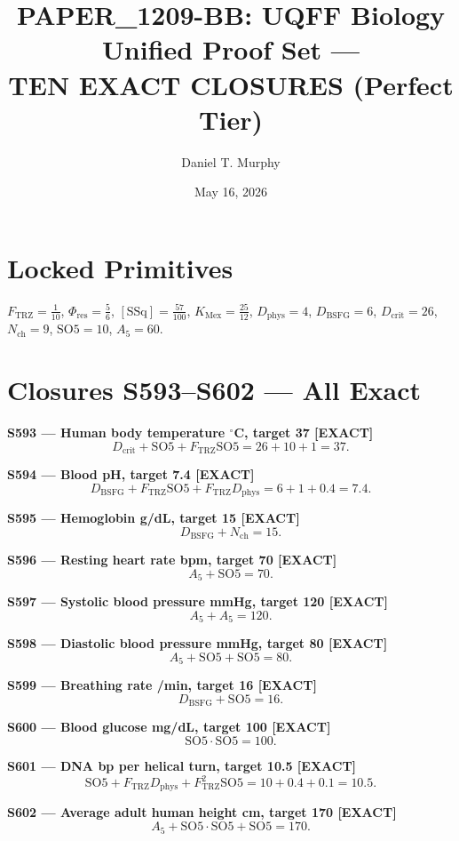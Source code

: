 \documentclass[11pt]{article}
\title{PAPER\_1209-BB: UQFF Biology Unified Proof Set ---\\
TEN EXACT CLOSURES (Perfect Tier)}
\author{Daniel T. Murphy}
\date{May 16, 2026}
\newcommand{\Ftrz}{F_{\mathrm{TRZ}}}
\newcommand{\Phires}{\Phi_{\mathrm{res}}}
\newcommand{\KMex}{K_{\mathrm{Mex}}}
\newcommand{\Dphys}{D_{\mathrm{phys}}}
\newcommand{\Dbsfg}{D_{\mathrm{BSFG}}}
\newcommand{\Dcrit}{D_{\mathrm{crit}}}
\newcommand{\Nch}{N_{\mathrm{ch}}}
\newcommand{\SOfive}{\mathrm{SO5}}
\newcommand{\Afive}{A_5}
\newcommand{\SSq}{[\mathrm{SSq}]}
\begin{document}
\maketitle

\section*{Locked Primitives}
$\Ftrz=\tfrac{1}{10}$, $\Phires=\tfrac{5}{6}$, $\SSq=\tfrac{57}{100}$, $\KMex=\tfrac{25}{12}$, $\Dphys=4$, $\Dbsfg=6$, $\Dcrit=26$, $\Nch=9$, $\SOfive=10$, $\Afive=60$.

\section*{Closures S593--S602 --- All Exact}

\textbf{S593 --- Human body temperature ${}^\circ$C, target 37 [EXACT]}
\[\Dcrit + \SOfive + \Ftrz\SOfive = 26 + 10 + 1 = 37.\]

\textbf{S594 --- Blood pH, target 7.4 [EXACT]}
\[\Dbsfg + \Ftrz\SOfive + \Ftrz\Dphys = 6 + 1 + 0.4 = 7.4.\]

\textbf{S595 --- Hemoglobin g/dL, target 15 [EXACT]}
\[\Dbsfg + \Nch = 15.\]

\textbf{S596 --- Resting heart rate bpm, target 70 [EXACT]}
\[\Afive + \SOfive = 70.\]

\textbf{S597 --- Systolic blood pressure mmHg, target 120 [EXACT]}
\[\Afive + \Afive = 120.\]

\textbf{S598 --- Diastolic blood pressure mmHg, target 80 [EXACT]}
\[\Afive + \SOfive + \SOfive = 80.\]

\textbf{S599 --- Breathing rate /min, target 16 [EXACT]}
\[\Dbsfg + \SOfive = 16.\]

\textbf{S600 --- Blood glucose mg/dL, target 100 [EXACT]}
\[\SOfive \cdot \SOfive = 100.\]

\textbf{S601 --- DNA bp per helical turn, target 10.5 [EXACT]}
\[\SOfive + \Ftrz\Dphys + \Ftrz^2\SOfive = 10 + 0.4 + 0.1 = 10.5.\]

\textbf{S602 --- Average adult human height cm, target 170 [EXACT]}
\[\Afive + \SOfive\cdot\SOfive + \SOfive = 170.\]
\end{document}
